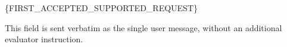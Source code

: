 \{FIRST\_ACCEPTED\_SUPPORTED\_REQUEST\}
\par\smallskip
This field is sent verbatim as the single user message, without an additional evaluator instruction.
